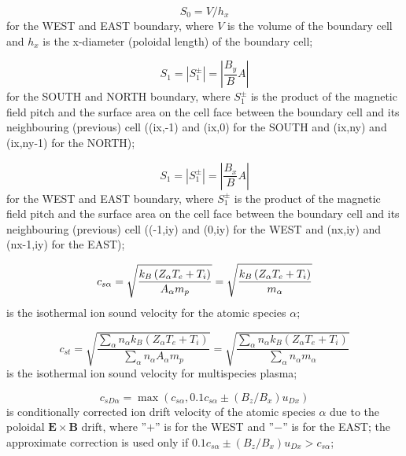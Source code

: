 \documentclass[11pt]{article}
\begin{document}
\bigskip

\begin{equation}
S_{0}=V/h_{x}   \label{6}
\end{equation}
for the WEST and EAST boundary, where $V$ is the volume of the boundary cell
and $h_{x}$ is the x-diameter (poloidal length) of the boundary cell;

\bigskip

\begin{equation}
S_{1}=\left| S_{1}^{\pm}\right| =\left| \frac{B_{y}}{B}A\right|   \label{7}
\end{equation}
for the SOUTH and NORTH boundary, where $S_{1}^{\pm}$ is the product of the
magnetic field pitch and the surface area on the cell face between the
boundary cell and its neighbouring (previous) cell ((ix,-1) and (ix,0) for
the SOUTH and (ix,ny) and (ix,ny-1) for the NORTH);

\bigskip

\begin{equation}
S_{1}=\left| S_{1}^{\pm}\right| =\left| \frac{B_{x}}{B}A\right|   \label{8}
\end{equation}
for the WEST and EAST boundary, where $S_{1}^{\pm}$ is the product of the
magnetic field pitch and the surface area on the cell face between the
boundary cell and its neighbouring (previous) cell ((-1,iy) and (0,iy) for
the WEST and (nx,iy) and (nx-1,iy) for the EAST);

\bigskip

\begin{equation}
c_{s\alpha}=\sqrt{\frac{k_{B}\left( Z_{\alpha}T_{e}+T_{i}\right) }{%
A_{\alpha}m_{p}}}=\sqrt{\frac{k_{B}\left( Z_{\alpha}T_{e}+T_{i}\right) }{%
m_{\alpha}}}   \label{9}
\end{equation}
is the isothermal ion sound velocity for the atomic species $\alpha$;

\bigskip

\begin{equation}
c_{st}=\sqrt{\frac{\sum_{\alpha}n_{\alpha}k_{B}\left(
Z_{\alpha}T_{e}+T_{i}\right) }{\sum_{\alpha}n_{\alpha}A_{\alpha}m_{p}}}=%
\sqrt{\frac {\sum_{\alpha}n_{\alpha}k_{B}\left( Z_{\alpha}T_{e}+T_{i}\right)
}{\sum_{\alpha}n_{\alpha}m_{\alpha}}}   \label{10}
\end{equation}
is the isothermal ion sound velocity for multispecies plasma;

\bigskip

\begin{equation}
c_{sD\alpha}=\max(c_{s\alpha},0.1c_{s\alpha}\pm\left( B_{z}/B_{x}\right)
u_{Dx})   \label{11}
\end{equation}
is conditionally corrected ion drift velocity of the atomic species $\alpha$
due to the poloidal $\mathbf{E\times B}$ drift, where ''$+$'' is for the
WEST and ''$-$'' is for the EAST; the approximate correction is used only if 
$0.1c_{s\alpha}\pm\left( B_{z}/B_{x}\right) u_{Dx}>c_{s\alpha}$;
\end{document}
